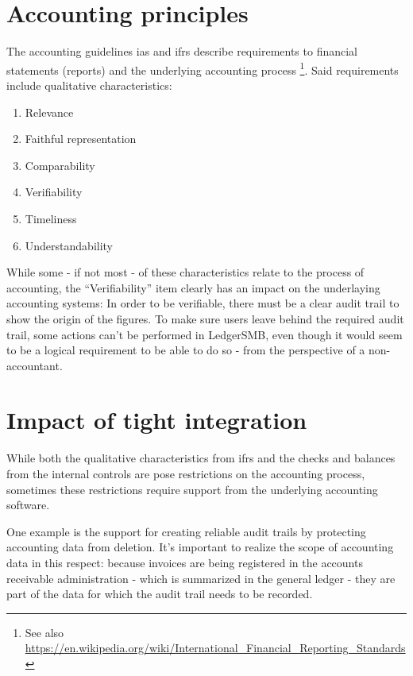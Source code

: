 \section{Accounting principles}
\label{sec-system-accounting-principles}

The accounting guidelines \gls{ias} and \gls{ifrs} describe requirements
to financial statements (reports) and the underlying accounting process
\footnote{See also \url{https://en.wikipedia.org/wiki/International_Financial_Reporting_Standards}}.
Said requirements include qualitative characteristics:

\begin{enumerate}
\item Relevance
\item Faithful representation
\item Comparability
\item Verifiability
\item Timeliness
\item Understandability
\end{enumerate}

While some - if not most - of these characteristics relate to the process of accounting,
the ``Verifiability'' item clearly has an impact on the underlaying accounting systems:
In order to be verifiable, there must be a clear audit trail to show the origin of the
figures. To make sure users leave behind the required audit trail, some actions can't
be performed in LedgerSMB, even though it would seem to be a logical requirement to be
able to do so - from the perspective of a non-accountant.


\section{Impact of tight integration}
\label{sec-system-impact-of-tight-integration}

While both the qualitative characteristics from \gls{ifrs} and the checks and balances
from the internal controls are pose restrictions on the accounting process,
sometimes these restrictions require support from the underlying accounting
software.

One example is the support for creating reliable audit trails
by protecting accounting data from deletion. It's important to realize the scope
of accounting data in this respect: because invoices are being registered in the
accounts receivable administration - which is summarized in the general ledger -
they are part of the data for which the audit trail needs to be recorded.


